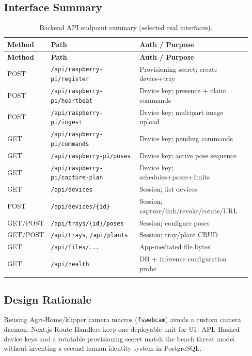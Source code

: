 \documentclass[11pt,letterpaper]{article}
\begin{document}
\subsection{Interface Summary}
\begin{center}
\begin{longtable}{@{}llp{5.8cm}@{}}
\toprule
\textbf{Method} & \textbf{Path} & \textbf{Auth / Purpose} \\
\midrule
\endfirsthead
\toprule
\textbf{Method} & \textbf{Path} & \textbf{Auth / Purpose} \\
\midrule
\endhead
POST & \texttt{/api/raspberry-pi/register} & Provisioning secret; create device+tray \\
POST & \texttt{/api/raspberry-pi/heartbeat} & Device key; presence + claim commands \\
POST & \texttt{/api/raspberry-pi/ingest} & Device key; multipart image upload \\
GET & \texttt{/api/raspberry-pi/commands} & Device key; pending commands \\
GET & \texttt{/api/raspberry-pi/poses} & Device key; active pose sequence \\
GET & \texttt{/api/raspberry-pi/capture-plan} & Device key; schedules+poses+limits \\
GET & \texttt{/api/devices} & Session; list devices \\
POST & \texttt{/api/devices/\{id\}} & Session; capture/link/revoke/rotate/URL \\
GET/POST & \texttt{/api/trays/\{id\}/poses} & Session; configure poses \\
GET/POST & \texttt{/api/trays}, \texttt{/api/plants} & Session; tray/plant CRUD \\
GET & \texttt{/api/files/...} & App-mediated file bytes \\
GET & \texttt{/api/health} & DB + inference configuration probe \\
\bottomrule
\caption{Backend API endpoint summary (selected real interfaces).}
\label{tab:interfaces}
\end{longtable}
\end{center}

\subsection{Design Rationale}
Reusing Agri-Home/klipper camera macros (\texttt{fswebcam}) avoids a custom camera daemon.
Next.js Route Handlers keep one deployable unit for UI+API. Hashed device keys and a rotatable
provisioning secret match the bench threat model without inventing a second human identity
system in PostgreSQL.
\end{document}
